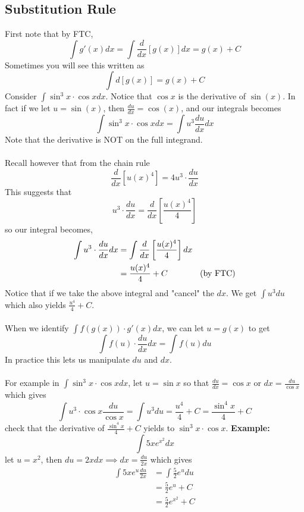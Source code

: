 \documentclass[10pt]{article}
\theoremstyle{break}
\begin{document}
\subsection{Substitution Rule}
First note that by FTC, $$\int g'(x) dx = \int \frac{d}{dx}[g(x)] dx = g(x) + C$$
Sometimes you will see this written as $$\int d[g(x)] = g(x) + C$$
Consider $\int \sin^3x \cdot \cos x dx$. Notice that $\cos x$ is the derivative of $\sin(x)$. In fact if we let
$u = \sin(x)$, then $\frac{du}{dx} = \cos(x)$, and our integrals becomes $$\int \sin^3 x \cdot \cos x dx = \int u^3 \frac{du}{dx} dx$$
Note that the derivative is NOT on the full integrand. \\ \vspace{0.5ex} \\
Recall however that from the chain rule $$\frac{d}{dx}[u(x)^4] = 4u^3 \cdot \frac{du}{dx}$$
This suggests that $$u^3 \cdot \frac{du}{dx} = \frac{d}{dx}\left[\frac{u(x)^4}{4}\right]$$
so our integral becomes, 
\begin{align*}
  \int u^3 \cdot \frac{du}{dx} dx &= \int \frac{d}{dx}\left[\frac{u(x)^4}{4}\right] dx \\
                                  &= \frac{u(x)^4}{4} + C \hspace{9ex} \text{(by FTC)}
\end{align*}
Notice that if we take the above integral and "cancel" the $dx$. We get $\int u^3 du$ which also yields $\frac{u^4}{4} + C$.
\\ \vspace{0.5ex} \\
When we identify $\int f(g(x)) \cdot g'(x) dx$, we can let $u = g(x)$ to get $$\int f(u) \cdot \frac{du}{dx} dx = \int f(u) du$$
In practice this lets us manipulate $du$ and $dx$. \\ \vspace{0.5ex} \\
For example in $\int \sin^3x \cdot \cos x dx$, let $u = \sin x$ so that $\frac{du}{dx} = \cos x$ or $dx = \frac{du}{\cos x}$ which gives 
$$\int u^3 \cdot \cos x \frac{du}{\cos x} = \int u^3 du = \frac{u^4}{4} + C = \frac{\sin^4 x}{4} + C$$
check that the derivative of $\frac{\sin^4 x}{4} + C$ yields to $\sin^3x \cdot \cos x$.
\textbf{Example: } $$\int 5xe^{x^2} dx$$
let $u = x^2$, then $du = 2x dx \implies dx = \frac{du}{2x}$ which gives
\begin{align*}
  \int 5xe^u \frac{du}{2x} &= \int \frac{5}{2}e^u du \\ 
                          &= \frac{5}{2}e^u + C \\
                          &= \frac{5}{2}e^{x^2} + C
\end{align*}
\end{document}
